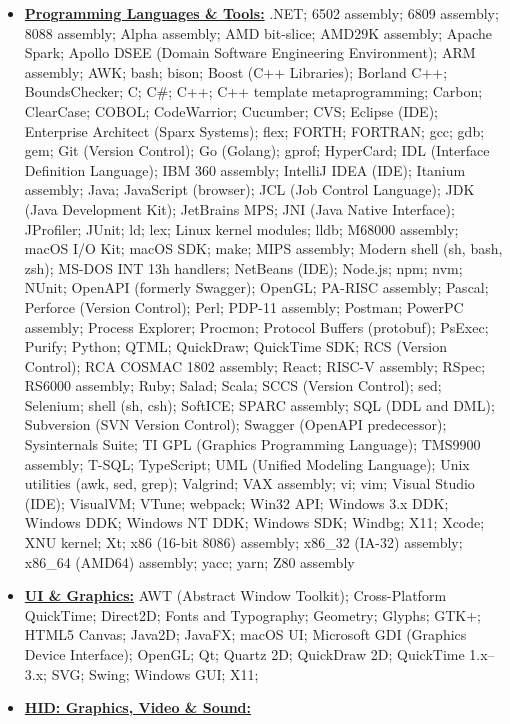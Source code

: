 \documentclass[letterpaper,11pt]{article}
\begin{document}
\begin{multicols}{4}
{\begin{itemize}[leftmargin=0.1in, label={}, itemsep=0pt, parsep=0pt, topsep=0pt, partopsep=0pt]
\item
\textbf{\uline{Programming Languages \& Tools:}}  \hspace{0pt}
.NET;
6502 assembly;
6809 assembly;
8088 assembly;
Alpha assembly;
AMD bit-slice;
AMD29K assembly;
Apache Spark;
Apollo DSEE (Domain Software Engineering Environment);
ARM assembly;
AWK;
bash;
bison;
Boost (C++ Libraries);
Borland C++;
BoundsChecker;
C;
C\#;
C++;
C++ template metaprogramming;
Carbon;
ClearCase;
COBOL;
CodeWarrior;
Cucumber;
CVS;
Eclipse (IDE);
Enterprise Architect (Sparx Systems);
flex;
FORTH;
FORTRAN;
gcc;
gdb;
gem;
Git (Version Control);
Go (Golang);
gprof;
HyperCard;
IDL (Interface Definition Language);
IBM 360 assembly;
IntelliJ IDEA (IDE);
Itanium assembly;
Java;
JavaScript (browser);
JCL (Job Control Language);
JDK (Java Development Kit);
JetBrains MPS;
JNI (Java Native Interface);
JProfiler;
JUnit;
ld;
lex;
Linux kernel modules;
lldb;
M68000 assembly;
macOS I/O Kit;
macOS SDK;
make;
MIPS assembly;
Modern shell (sh, bash, zsh);
MS-DOS INT 13h handlers;
NetBeans (IDE);
Node.js;
npm;
nvm;
NUnit;
OpenAPI (formerly Swagger);
OpenGL;
PA-RISC assembly;
Pascal;
Perforce (Version Control);
Perl;
PDP-11 assembly;
Postman;
PowerPC assembly;
Process Explorer;
Procmon;
Protocol Buffers (protobuf);
PsExec;
Purify;
Python;
QTML;
QuickDraw;
QuickTime SDK;
RCS (Version Control);
RCA COSMAC 1802 assembly;
React;
RISC-V assembly;
RSpec;
RS6000 assembly;
Ruby;
Salad;
Scala;
SCCS (Version Control);
sed;
Selenium;
shell (sh, csh);
SoftICE;
SPARC assembly;
SQL (DDL and DML);
Subversion (SVN Version Control);
Swagger (OpenAPI predecessor);
Sysinternals Suite;
TI GPL (Graphics Programming Language);
TMS9900 assembly;
T-SQL;
TypeScript;
UML (Unified Modeling Language);
Unix utilities (awk, sed, grep);
Valgrind;
VAX assembly;
vi;
vim;
Visual Studio (IDE);
VisualVM;
VTune;
webpack;
Win32 API;
Windows 3.x DDK;
Windows DDK;
Windows NT DDK;
Windows SDK;
Windbg;
X11;
Xcode;
XNU kernel;
Xt;
x86 (16-bit 8086) assembly;
x86\_32 (IA-32) assembly;
x86\_64 (AMD64) assembly;
yacc;
yarn;
Z80 assembly
\item
\textbf{\uline{UI \& Graphics:}} \hspace{0pt}
AWT (Abstract Window Toolkit);
Cross-Platform QuickTime;
Direct2D;
Fonts and Typography;
Geometry;
Glyphs;
GTK+;
HTML5 Canvas;
Java2D;
JavaFX;
macOS UI;
Microsoft GDI (Graphics Device Interface);
OpenGL;
Qt;
Quartz 2D;
QuickDraw 2D;
QuickTime 1.x--3.x;
SVG;
Swing;
Windows GUI;
X11;
\item
\textbf{\uline{HID: Graphics, Video \& Sound:}} \hspace{0pt}

\end{itemize}}
\end{multicols}
\end{document}
